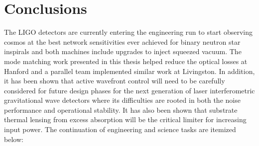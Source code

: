 \chapter{Conclusions}
The LIGO detectors are currently entering the engineering run to start observing cosmos at the best network sensitivities ever achieved for binary neutron star inspirals and both machines include upgrades to inject squeezed vacuum. The mode matching work presented in this thesis helped reduce the optical losses at Hanford and a parallel team implemented similar work at Livingston.  In addition, it has been shown that active wavefront control will need to be carefully considered for future design phases for the next generation of laser interferometric gravitational wave detectors where its difficulties are rooted in both the noise performance and operational stability.  It has also been shown that substrate thermal lensing from excess absorption will be the critical limiter for increasing input power.  The continuation of engineering and science tasks are itemized below:

